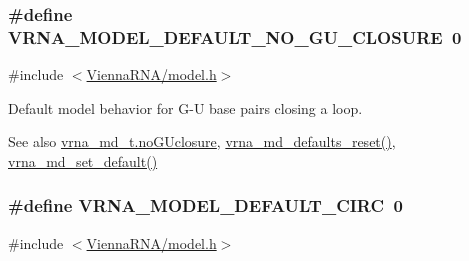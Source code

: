 \subsubsection[{\texorpdfstring{V\+R\+N\+A\+\_\+\+M\+O\+D\+E\+L\+\_\+\+D\+E\+F\+A\+U\+L\+T\+\_\+\+N\+O\+\_\+\+G\+U\+\_\+\+C\+L\+O\+S\+U\+RE}{VRNA_MODEL_DEFAULT_NO_GU_CLOSURE}}]{\setlength{\rightskip}{0pt plus 5cm}\#define V\+R\+N\+A\+\_\+\+M\+O\+D\+E\+L\+\_\+\+D\+E\+F\+A\+U\+L\+T\+\_\+\+N\+O\+\_\+\+G\+U\+\_\+\+C\+L\+O\+S\+U\+RE~0}\hypertarget{group__model__details_ga5308de46faaca4b9fd16045864901ee7}{}\label{group__model__details_ga5308de46faaca4b9fd16045864901ee7}


{\ttfamily \#include $<$\hyperlink{model_8h}{Vienna\+R\+N\+A/model.\+h}$>$}



Default model behavior for G-\/U base pairs closing a loop. 

\begin{DoxySeeAlso}{See also}
\hyperlink{group__model__details_a7e883db1f33f8f3baa5c9b140350c78e}{vrna\+\_\+md\+\_\+t.\+no\+G\+Uclosure}, \hyperlink{group__model__details_ga70834424cf804d149937de89f80ceb45}{vrna\+\_\+md\+\_\+defaults\+\_\+reset()}, \hyperlink{group__model__details_ga8ac6ff84936282436f822644bf841f66}{vrna\+\_\+md\+\_\+set\+\_\+default()} 
\end{DoxySeeAlso}
\subsubsection[{\texorpdfstring{V\+R\+N\+A\+\_\+\+M\+O\+D\+E\+L\+\_\+\+D\+E\+F\+A\+U\+L\+T\+\_\+\+C\+I\+RC}{VRNA_MODEL_DEFAULT_CIRC}}]{\setlength{\rightskip}{0pt plus 5cm}\#define V\+R\+N\+A\+\_\+\+M\+O\+D\+E\+L\+\_\+\+D\+E\+F\+A\+U\+L\+T\+\_\+\+C\+I\+RC~0}\hypertarget{group__model__details_ga22059033db7bcd875c51fec32425490a}{}\label{group__model__details_ga22059033db7bcd875c51fec32425490a}


{\ttfamily \#include $<$\hyperlink{model_8h}{Vienna\+R\+N\+A/model.\+h}$>$}



